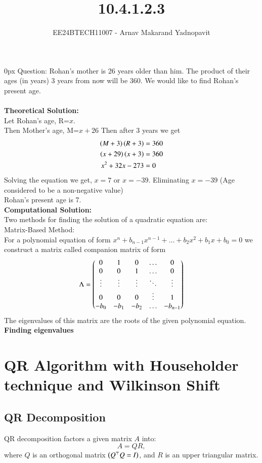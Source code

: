 \documentclass[journal,12pt,onecolumn]{IEEEtran}
\theoremstyle{remark}
\begin{document}
\title{10.4.1.2.3}
\author{EE24BTECH11007 - Arnav Makarand Yadnopavit}
\maketitle
\renewcommand{\thefigure}{\theenumi}
\renewcommand{\thetable}{\theenumi}
\parindent 0px Question: Rohan's mother is 26 years older than him. The product of their ages (in years)
3 years from now will be 360. We would like to find Rohan's present age.\\
\solution\\
\textbf{Theoretical Solution:}\\
Let Rohan's age, R=$x$.\\
Then Mother's age, M=$x+26$
Then after 3 years we get
\begin{align}
    \left(M+3\right)\left(R+3\right)&=360 \label{eq:f}\\
    \left(x+29\right)\left(x+3\right)&=360\\
    x^2+32x-273&=0\\
\end{align}
Solving the equation we get, $x=7$ or $x=-39$. Eliminating $x=-39$ (Age considered to be a non-negative value)\\
Rohan's present age is 7.\\ 
\textbf{Computational Solution:}\\
Two methods for finding the solution of a quadratic equation are:\\
Matrix-Based Method:\\
For a polynomial equation of form $x^n+b_{n-1}x^{n-1}+\dots+b_2x^2+b_1x+b_0 = 0$ we construct a matrix called companion matrix of form
\begin{align}
	\Lambda = \begin{pmatrix}0&1&0&\dots&0\\ 0&0&1&\dots&0\\ \vdots &\vdots &\vdots &\ddots&\vdots\\0&0&0&\vdots&1\\-b_0&-b_1&-b_2&\dots&-b_{n-1}\end{pmatrix}
\end{align}
The eigenvalues of this matrix are the roots of the given polynomial equation.\\
\textbf{Finding eigenvalues}
\section{QR Algorithm with Householder technique and Wilkinson Shift}
\subsection{QR Decomposition}
QR decomposition factors a given matrix $A$ into:
$$A = QR,$$
where $Q$ is an orthogonal matrix $\left(Q^\top Q = I\right)$, and $R$ is an upper triangular matrix.
\end{document}
